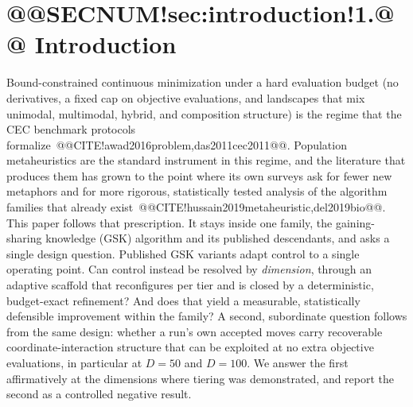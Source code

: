 \documentclass[10pt,a4paper]{article}
\begin{document}
\section{@@SECNUM!sec:introduction!1.@@ Introduction}\label{sec:introduction}


Bound-constrained continuous minimization under a hard evaluation
budget (no derivatives, a fixed cap on objective evaluations, and
landscapes that mix unimodal, multimodal, hybrid, and composition
structure) is the regime that the CEC benchmark protocols
formalize~@@CITE!awad2016problem,das2011cec2011@@. 
Population metaheuristics are the standard instrument in this regime,
and the literature that produces them has grown to the point where its
own surveys ask for fewer new metaphors and for more rigorous,
statistically tested analysis of the algorithm families that already
exist~@@CITE!hussain2019metaheuristic,del2019bio@@.
This paper follows that prescription. It stays inside one family, the
gaining-sharing knowledge (GSK) algorithm and its published descendants,
and asks a single design question. Published GSK variants adapt control to a single
operating point. Can control instead be resolved by \emph{dimension}, through
an adaptive scaffold that reconfigures per tier and is closed by a
deterministic, budget-exact refinement? And does that yield a measurable,
statistically defensible improvement within the family?
A second, subordinate question follows from the same design: whether a run's
own accepted moves carry recoverable coordinate-interaction structure that
can be exploited at no extra objective evaluations, in particular at
$D = 50$ and $D = 100$. We answer the first affirmatively at the dimensions
where tiering was demonstrated, and report the second as a controlled negative
result.
\end{document}

